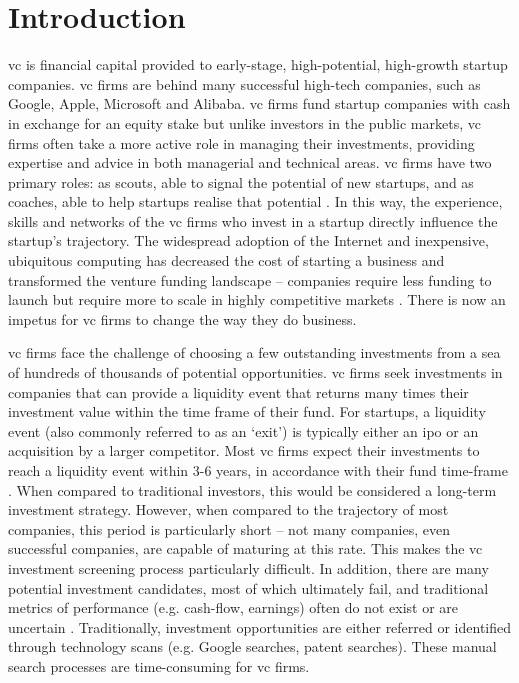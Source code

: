 \documentclass[../thesis/thesis.tex]{subfiles}
\begin{document}
\chapter{Introduction}
\label{chap:introduction}

\Gls{vc} is financial capital provided to early-stage, high-potential, high-growth startup companies. \Gls{vc} firms are behind many successful high-tech companies, such as Google, Apple, Microsoft and Alibaba. \Gls{vc} firms fund startup companies with cash in exchange for an equity stake but unlike investors in the public markets, \gls{vc} firms often take a more active role in managing their investments, providing expertise and advice in both managerial and technical areas. \Gls{vc} firms have two primary roles: as scouts, able to signal the potential of new startups, and as coaches, able to help startups realise that potential \cite{baum2004}. In this way, the experience, skills and networks of the \gls{vc} firms who invest in a startup directly influence the startup's trajectory. The widespread adoption of the Internet and inexpensive, ubiquitous computing has decreased the cost of starting a business and transformed the venture funding landscape -- companies require less funding to launch but require more to scale in highly competitive markets \cite{graham2013}. There is now an impetus for \gls{vc} firms to change the way they do business.

\Gls{vc} firms face the challenge of choosing a few outstanding investments from a sea of hundreds of thousands of potential opportunities. \Gls{vc} firms seek investments in companies that can provide a liquidity event that returns many times their investment value within the time frame of their fund. For startups, a liquidity event (also commonly referred to as an `exit') is typically either an \gls{ipo} or an acquisition by a larger competitor. Most \gls{vc} firms expect their investments to reach a liquidity event within 3-6 years, in accordance with their fund time-frame \cite{gompers1995}. When compared to traditional investors, this would be considered a long-term investment strategy. However, when compared to the trajectory of most companies, this period is particularly short -- not many companies, even successful companies, are capable of maturing at this rate. This makes the \gls{vc} investment screening process particularly difficult. In addition, there are many potential investment candidates, most of which ultimately fail, and traditional metrics of performance (e.g. cash-flow, earnings) often do not exist or are uncertain \cite{shane2002}. Traditionally, investment opportunities are either referred or identified through technology scans (e.g. Google searches, patent searches). These manual search processes are time-consuming for \gls{vc} firms.
\end{document}
